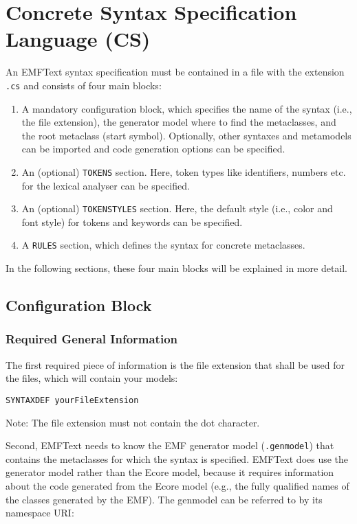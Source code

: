 \chapter{Concrete Syntax Specification Language (CS)}
\label{chap:cs}

An EMFText syntax specification must be contained in a file with the 
extension \texttt{.cs} and consists of four main blocks:

\begin{enumerate}
  \item A mandatory configuration block, which specifies the name of the syntax
        (i.e., the file extension), the generator model where to find the
        metaclasses, and the root metaclass (start symbol). Optionally, other
        syntaxes and metamodels can be imported and code generation options can
        be specified.
  \item An (optional) \texttt{TOKENS} section. Here, token types like identifiers, numbers etc.
  		 for the lexical analyser can be specified.
  \item An (optional) \texttt{TOKENSTYLES} section. Here, the default style
        (i.e., color and font style) for tokens and keywords can be specified.
  \item A \texttt{RULES} section, which defines the syntax for concrete
        metaclasses.
\end{enumerate}

In the following sections, these four main blocks will be explained in more
detail.

\section{Configuration Block}

\subsection{Required General Information}

The first required piece of information is the file extension that shall
be used for the files, which will contain your models:

\lstset{language=CS}
\begin{lstlisting}
SYNTAXDEF yourFileExtension
\end{lstlisting}

Note: The file extension must not contain the dot character.

Second, EMFText needs to know the EMF generator model (\texttt{.genmodel}) that
contains the metaclasses for which the syntax is specified. EMFText does use
the generator model rather than the Ecore model, because it requires
information about the code generated from the Ecore model (e.g., the fully
qualified names of the classes generated by the EMF). The genmodel can be referred 
to by its namespace URI: 

